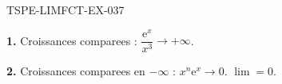 \begin{corrige}{TSPE-LIMFCT-EX-037}

\textbf{1.} Croissances comparees : $\dfrac{\mathrm{e}^x}{x^3} \to \boxed{+\infty}$.

\textbf{2.} Croissances comparees en $-\infty$ : $x^n\mathrm{e}^x \to 0$. $\boxed{\lim = 0}$.

\end{corrige}
